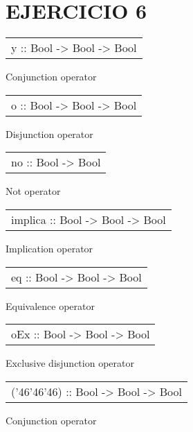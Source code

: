 \section{EJERCICIO 6}
\begin{haddockdesc}
\item[\begin{tabular}{@{}l}
y :: Bool -> Bool -> Bool
\end{tabular}]
{\haddockbegindoc
Conjunction operator\par}
\end{haddockdesc}
\begin{haddockdesc}
\item[\begin{tabular}{@{}l}
o :: Bool -> Bool -> Bool
\end{tabular}]
{\haddockbegindoc
Disjunction operator\par}
\end{haddockdesc}
\begin{haddockdesc}
\item[\begin{tabular}{@{}l}
no :: Bool -> Bool
\end{tabular}]
{\haddockbegindoc
Not operator\par}
\end{haddockdesc}
\begin{haddockdesc}
\item[\begin{tabular}{@{}l}
implica :: Bool -> Bool -> Bool
\end{tabular}]
{\haddockbegindoc
Implication operator\par}
\end{haddockdesc}
\begin{haddockdesc}
\item[\begin{tabular}{@{}l}
eq :: Bool -> Bool -> Bool
\end{tabular}]
{\haddockbegindoc
Equivalence operator\par}
\end{haddockdesc}
\begin{haddockdesc}
\item[\begin{tabular}{@{}l}
oEx :: Bool -> Bool -> Bool
\end{tabular}]
{\haddockbegindoc
Exclusive disjunction operator\par}
\end{haddockdesc}
\begin{haddockdesc}
\item[\begin{tabular}{@{}l}
({\char '46}{\char '46}{\char '46}) :: Bool -> Bool -> Bool
\end{tabular}]
{\haddockbegindoc
Conjunction operator\par}
\end{haddockdesc}
